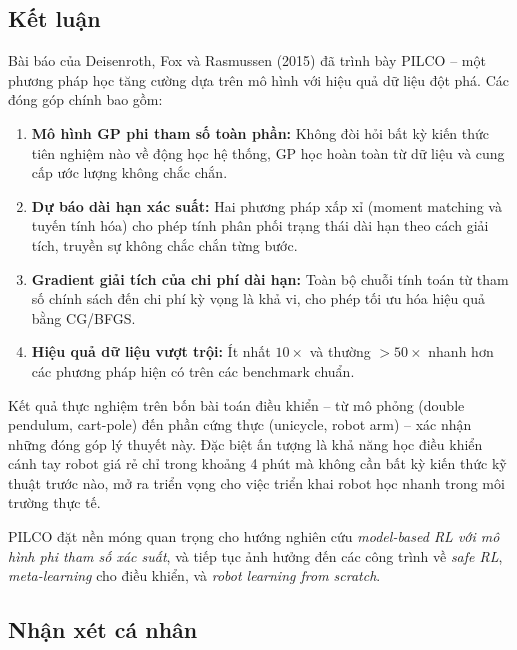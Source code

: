 \subsection{Kết luận}
\label{SUB_SEC_final_conclusion}

Bài báo của Deisenroth, Fox và Rasmussen (2015) \cite{Deisenroth_2015} đã trình bày PILCO -- một phương pháp học tăng cường dựa trên mô hình với hiệu quả dữ liệu đột phá. Các đóng góp chính bao gồm:

\begin{enumerate}
    \item \textbf{Mô hình GP phi tham số toàn phần:} Không đòi hỏi bất kỳ kiến thức tiên nghiệm nào về động học hệ thống, GP học hoàn toàn từ dữ liệu và cung cấp ước lượng không chắc chắn.
    
    \item \textbf{Dự báo dài hạn xác suất:} Hai phương pháp xấp xỉ (moment matching và tuyến tính hóa) cho phép tính phân phối trạng thái dài hạn theo cách giải tích, truyền sự không chắc chắn từng bước.
    
    \item \textbf{Gradient giải tích của chi phí dài hạn:} Toàn bộ chuỗi tính toán từ tham số chính sách đến chi phí kỳ vọng là khả vi, cho phép tối ưu hóa hiệu quả bằng CG/BFGS.
    
    \item \textbf{Hiệu quả dữ liệu vượt trội:} Ít nhất $10\times$ và thường $>50\times$ nhanh hơn các phương pháp hiện có trên các benchmark chuẩn.
\end{enumerate}

Kết quả thực nghiệm trên bốn bài toán điều khiển -- từ mô phỏng (double pendulum, cart-pole) đến phần cứng thực (unicycle, robot arm) -- xác nhận những đóng góp lý thuyết này. Đặc biệt ấn tượng là khả năng học điều khiển cánh tay robot giá rẻ chỉ trong khoảng 4 phút mà không cần bất kỳ kiến thức kỹ thuật trước nào, mở ra triển vọng cho việc triển khai robot học nhanh trong môi trường thực tế.

PILCO đặt nền móng quan trọng cho hướng nghiên cứu \textit{model-based RL với mô hình phi tham số xác suất}, và tiếp tục ảnh hưởng đến các công trình về \textit{safe RL}, \textit{meta-learning} cho điều khiển, và \textit{robot learning from scratch}.

\subsection{Nhận xét cá nhân}
\label{SUB_SEC_personal_opinion}

